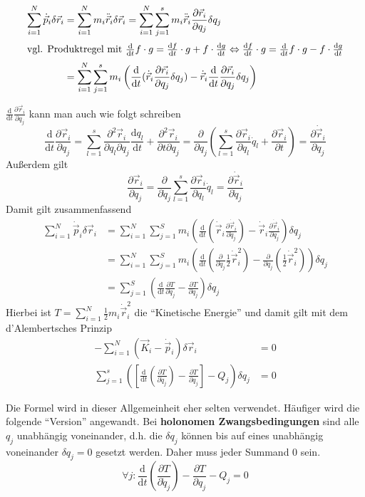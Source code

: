 \documentclass[oneside]{book}
\theoremstyle{definition}
\renewcommand{\d}{\mathrm d}
\newcommand{\dd}[1]{\frac{\d}{\d #1}}
\newcommand{\ddd}[2]{\frac{\d #1}{\d #2}}
\newcommand{\fpartial}[1]{\frac{\partial}{\partial #1}}
\newcommand{\ffpartial}[2]{\frac{\partial #1}{\partial #2}}
\newcommand{\dotvec}[1]{\dot{\vec{#1}}}
\begin{document}
\begin{align*}
\sum_{i = 1}^{N} \dot{\vec{p}}_i \delta \vec{r}_i 
&= \sum_{i = 1}^N m_i \ddot{\vec{r}}_i \delta \vec{r}_i 
= \sum_{i = 1}^N \sum_{j = 1}^s m_i \ddot{\vec{r}}_i  \ffpartial{\vec{r}_i}{q_j} \delta q_j \\
\intertext{vgl. Produktregel mit $\dd t f \cdot g = \ddd{f}{t} \cdot g + f \cdot \ddd{g}{t} \Leftrightarrow \ddd{f}{t} \cdot g = \dd t f \cdot g - f \cdot \ddd{g}{t}$}
&= \sum_{i=1}^N \sum_{j=1}^s m_i \left(\dd{t} (\dot{\vec{r}}_i \ffpartial{\vec{r_i}}{q_j} \delta q_j) -\dot{\vec{r}}_i \dd{t} \ffpartial{\vec{r}_i}{q_j} \delta q_j \right)
\end{align*}

$\dd t \ffpartial{\vec{r}_i}{q_j}$ kann man auch wie folgt schreiben 
$$\dd{t} \ffpartial{\vec{r}_i}{q_j} = \sum_{l=1}^s \frac{\partial^2 \vec{r}_i}{\partial q_l \partial q_j} \frac{\d q_l}{\d t} + \frac{\partial^2 \vec{r}_i}{\partial t \partial q_j} = \fpartial{q_j} \left( \sum_{l=1}^s \ffpartial{\vec{r}_i}{q_l} \dot{q}_l + \ffpartial{\vec{r}_i}{t}\right) = \ffpartial{\dot{\vec{r}}_i}{q_j}$$
Außerdem gilt
$$\ffpartial{\vec{r}_i}{q_j} = \fpartial{\dot q_j} \sum_{l = 1}^s \ffpartial{\vec{r}_i}{q_l} \dot{q}_l = \ffpartial{\dot{\vec{r}}_i}{\dot{q}_j}$$
Damit gilt zusammenfassend
\begin{align*}
\sum_{i = 1}^N \dot{\vec{p}}_i \delta \vec{r}_i &= \sum_{i=1}^N \sum_{j = 1}^S m_i \left( \dd{t} (\dotvec{r}_i  \ffpartial{\dot{\vec{r}}_i}{\dot{q}_j})  -\dot{\vec{r}}_i \ffpartial{\dotvec r_i}{q_j} \right) \delta q_j\\ 
&= \sum_{i=1}^N\sum_{j=1}^S m_i \left(  \dd{t} (\fpartial{\dot q_j} \frac12 \dotvec{r}_i^2) -\fpartial{q_j} (\frac12 \dot{\vec{r}}_i^2) \right) \delta q_j \\
&= \sum_{j = 1}^S \left( \dd{t} \ffpartial{T}{\dot{q}_j} - \ffpartial{T}{q_j} \right) \delta q_j
\end{align*}
Hierbei ist $T = \sum_{i = 1}^{N} \frac12 m_i \dot{\vec{r}}_i^2$ die "`Kinetische Energie"'
und damit gilt mit dem d'Alembertsches Prinzip
\begin{align*}
- \sum_{i = 1}^{N} (\vec{K}_i - \dot{\vec{p}}_i) \delta \vec{r}_i &= 0\\
\sum_{j = 1}^s( [\dd{t} ( \ffpartial{T}{\dot{q}_j}) - \ffpartial{T}{q_j}] - Q_j ) \delta q_j &= 0
\end{align*}

Die Formel wird in dieser Allgemeinheit eher selten verwendet. Häufiger wird die folgende "`Version"' angewandt. Bei \textbf{holonomen Zwangsbedingungen} sind alle $q_j$ unabhängig voneinander, d.h. die $\delta q_j$  können bis auf eines unabhängig voneinander $\delta q_j = 0$ gesetzt werden. Daher muss jeder Summand 0 sein.
$$\forall j:  \dd t ( \ffpartial{T}{\dot{q}_j}) - \ffpartial{T}{q_j} - Q_j = 0$$
\end{document}
